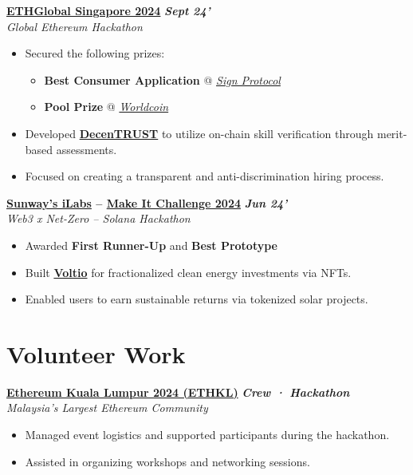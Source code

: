\documentclass[letterpaper,10pt]{article}
\newcommand{\heading}[2]{
  \hspace{4pt}#1\hfill#2\\
}
\newcommand{\headingBf}[2]{
  \heading{\textbf{#1}}{
    \textbf{\textit{\small{#2}}}
  }
}
\newenvironment{bulletList}{
  \begin{itemize}[itemsep=1pt, parsep=1pt, leftmargin=26pt]
}{
  \end{itemize}
}
\newcommand{\oneFrag}[4]{
  \headingBf{#1}{#2}
  \hspace{6pt}\textit{#3}
  \vspace{-4pt}
  #4
}
\newenvironment{nestedBulletList}{
  \begin{itemize}[itemsep=1pt, parsep=1pt, leftmargin=14pt]
}{
  \end{itemize}
}
\begin{document}
\vspace{2pt}
\oneFrag{
  \href{https://ethglobal.com/events/singapore2024}{ETHGlobal Singapore 2024}
}{
  Sept 24'
}{
  Global Ethereum Hackathon
}{
  \begin{bulletList}
    \item Secured the following prizes:
    \vspace{-4pt}
    \begin{nestedBulletList}
      \item \textbf{Best Consumer Application} @ \textit{\href{https://sign.global}{Sign Protocol}}
      \item \textbf{Pool Prize} @ \textit{\href{https://worldcoin.org}{Worldcoin}}
    \end{nestedBulletList}
    \item Developed \textbf{\href{https://ethglobal.com/showcase/decentrust-vwp81}{DecenTRUST}} to utilize on-chain skill verification through merit-based assessments.
    \item Focused on creating a transparent and anti-discrimination hiring process.
  \end{bulletList}
}

\vspace{2pt}
\oneFrag{
  \href{https://innovationlabs.sunway.edu.my}{Sunway's iLabs} -- \href{https://x.com/SuperteamMY/status/1815758624716931379}{Make It Challenge 2024}
}{
  Jun 24'
}{
  Web3 x Net-Zero -- Solana Hackathon
}{
  \begin{bulletList}
    \item Awarded \textbf{First Runner-Up} and \textbf{Best Prototype}
    \item Built \textbf{\href{https://github.com/eesuhn/voltio}{Voltio}} for fractionalized clean energy investments via NFTs.
    \item Enabled users to earn sustainable returns via tokenized solar projects.
  \end{bulletList}
}


\section{Volunteer Work}

\oneFrag{
  \href{https://www.2024.ethkl.org}{Ethereum Kuala Lumpur 2024 (ETHKL)}
}{
  Crew · Hackathon
}{
  Malaysia's Largest Ethereum Community
}{
  \begin{bulletList}
    \item Managed event logistics and supported participants during the hackathon.
    \item Assisted in organizing workshops and networking sessions.
  \end{bulletList}
}
\end{document}
